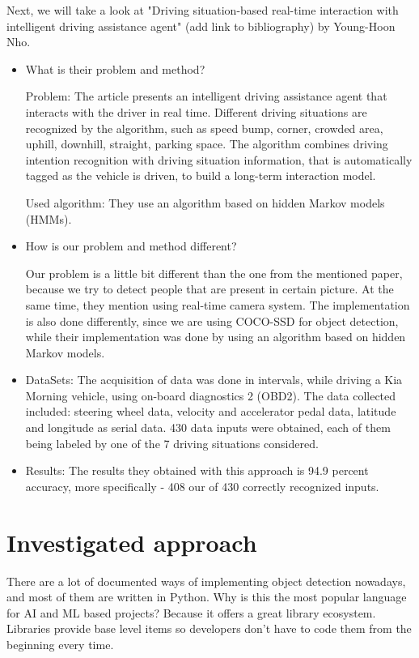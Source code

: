 \documentclass[runningheads,a4paper,11pt]{report}
\begin{document}
    Next, we will take a look at "Driving situation-based real-time interaction with intelligent driving assistance agent" (add link to bibliography) by Young-Hoon Nho.
    \begin{itemize}
	\item What is their problem and method?
	
	Problem: The article presents an intelligent driving assistance agent that interacts with the driver in real time. Different driving situations are recognized by the algorithm, such as speed bump, corner, crowded area, uphill, downhill, straight, parking space. The algorithm combines driving intention recognition with driving situation information, that is automatically tagged as the vehicle is driven, to build a long-term interaction model.
	
	Used algorithm: They use an algorithm based on hidden Markov models (HMMs).
	\item How is our problem and method different? 
	
	Our problem is a little bit different than the one from the mentioned paper, because we try to detect people that are present in certain picture. At the same time, they mention using real-time camera system. The implementation is also done differently, since we are using COCO-SSD for object detection, while their implementation was done by using an algorithm based on hidden Markov models.
	\item DataSets: The acquisition of data was done in intervals, while driving a Kia Morning vehicle, using on-board diagnostics 2 (OBD2). The data collected included: steering wheel data, velocity and accelerator pedal data, latitude and longitude as serial data. 430 data inputs were obtained, each of them being labeled by one of the 7 driving situations considered.
	\item Results: The results they obtained with this approach is 94.9 percent accuracy, more specifically - 408 our of 430 correctly recognized inputs.
    
\end{itemize}



\chapter{Investigated approach}
\label{chapter:proposedApproach}


There are a lot of documented ways of implementing object detection nowadays, and most of them are written in Python. Why is this the most popular language for AI and ML based projects? Because it offers a great library ecosystem. Libraries provide base level items so developers don't have to code them from the beginning every time.
\end{document}
